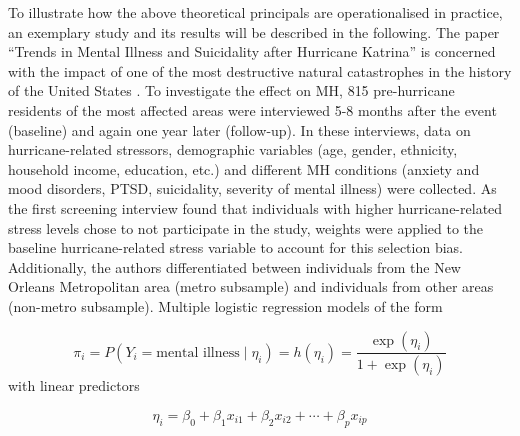\documentclass[
]{krantz}
\begin{document}
To illustrate how the above theoretical principals are operationalised in practice, an exemplary study and its results will be described in the following. The paper ``Trends in Mental Illness and Suicidality after Hurricane Katrina'' \citep{kesslerTrendsMentalIllness2008} is concerned with the impact of one of the most destructive natural catastrophes in the history of the United States \citep{graumannHurricaneKatrinaClimatological2006}. To investigate the effect on MH, 815 pre-hurricane residents of the most affected areas were interviewed 5-8 months after the event (baseline) and again one year later (follow-up). In these interviews, data on hurricane-related stressors, demographic variables (age, gender, ethnicity, household income, education, etc.) and different MH conditions (anxiety and mood disorders, PTSD, suicidality, severity of mental illness) were collected. As the first screening interview found that individuals with higher hurricane-related stress levels chose to not participate in the study, weights were applied to the baseline hurricane-related stress variable to account for this selection bias. Additionally, the authors differentiated between individuals from the New Orleans Metropolitan area (metro subsample) and individuals from other areas (non-metro subsample). Multiple logistic regression models of the form

\[
\pi_i = P(Y_i = \text{mental illness} \mid \eta_i) = h(\eta_i) = \frac{\exp(\eta_i)}{1 + \exp(\eta_i)}
\]
with linear predictors

\[
\eta_i = \beta_0 + \beta_1 x_{i1} + \beta_2 x_{i2} + \cdots + \beta_p x_{ip}
\]
\end{document}
